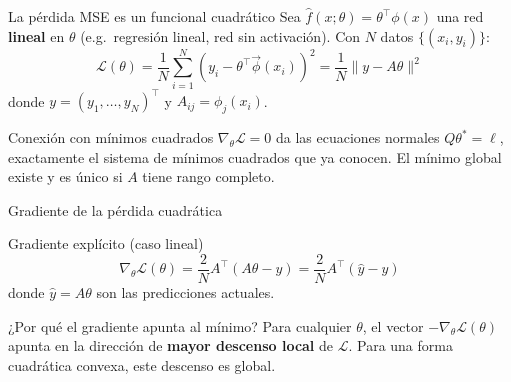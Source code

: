 \documentclass[aspectratio=169,12pt]{beamer}
\begin{document}
\begin{frame}{La pérdida MSE es un funcional cuadrático}
	Sea $\hat{f}(x;\theta) = \theta^\top \phi(x)$ una red \textbf{lineal} en $\theta$
	(e.g.\ regresión lineal, red sin activación).
	Con $N$ datos $\{(x_i, y_i)\}$:
	\[
	\mathcal{L}(\theta)
	= \frac{1}{N}\sum_{i=1}^N (y_i - \theta^\top\vec{\phi}(x_i))^2
	= \frac{1}{N}\|y - A\theta\|^2
	\]
	donde $y = (y_1,\ldots,y_N)^\top$ y $A_{ij} = \phi_j(x_i)$.
	
	\vspace{6pt}
	
	\begin{obsbox}{Conexión con mínimos cuadrados}
		$\nabla_\theta \mathcal{L} = 0$ da las ecuaciones normales $Q\theta^* = \ell$,
		exactamente el sistema de mínimos cuadrados que ya conocen.
		El mínimo global existe y es único si $A$ tiene rango completo.
	\end{obsbox}
\end{frame}

\begin{frame}{Gradiente de la pérdida cuadrática}
	\begin{resultbox}{Gradiente explícito (caso lineal)}
		\[
		\nabla_\theta \mathcal{L}(\theta)
		= \frac{2}{N} A^\top(A\theta - y)
		= \frac{2}{N} A^\top(\hat{y} - y)
		\]
		donde $\hat{y} = A\theta$ son las predicciones actuales.
	\end{resultbox}
	
	\vspace{6pt}
	\begin{obsbox}{¿Por qué el gradiente apunta al mínimo?}
		Para cualquier $\theta$, el vector $-\nabla_\theta\mathcal{L}(\theta)$ apunta
		en la dirección de \textbf{mayor descenso local} de $\mathcal{L}$.
		Para una forma cuadrática convexa, este descenso es global.
	\end{obsbox}
	
\end{frame}
\end{document}
